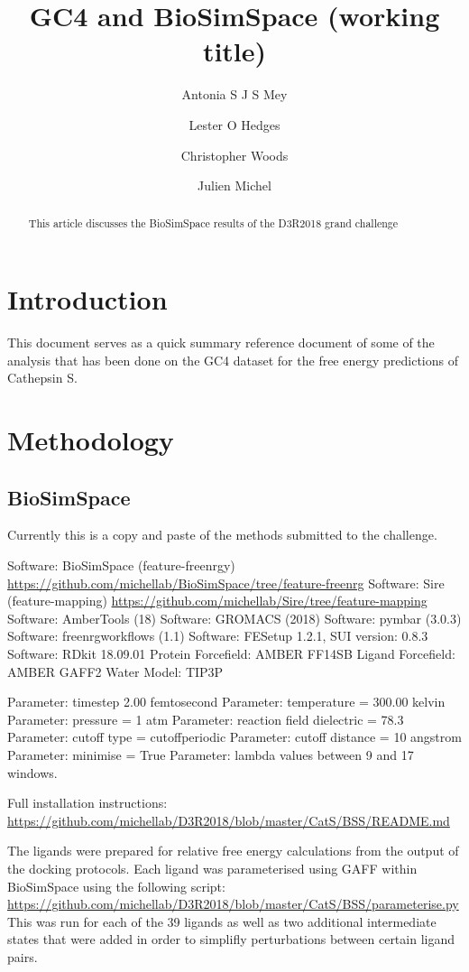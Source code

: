 \documentclass[9pt,comparison]{livecoms}
\title{GC4 and BioSimSpace (working title)}
\author[1*]{Antonia S J S Mey}
\author[2*\authfn{1}\authfn{3}]{Lester O Hedges}
\author[2\authfn{1}\authfn{4}]{Christopher Woods}
\author[1]{Julien Michel }
\affil[1]{Edinburgh}
\affil[2]{Bristol}
\begin{document}
\begin{frontmatter}
\maketitle

\begin{abstract}
This article discusses the BioSimSpace results of the D3R2018 grand challenge
\end{abstract}

\end{frontmatter}




\section{Introduction}

This document serves as a quick summary reference document of some of the analysis that has been done on the GC4 dataset for the free energy predictions of Cathepsin S. 

\section{Methodology}
\subsection{BioSimSpace}
Currently this is a copy and paste of the methods submitted to the challenge.

Software: BioSimSpace (feature-freenrgy) \url{https://github.com/michellab/BioSimSpace/tree/feature-freenrg}
Software: Sire (feature-mapping) \url{https://github.com/michellab/Sire/tree/feature-mapping}
Software: AmberTools (18)
Software: GROMACS (2018)
Software: pymbar (3.0.3)
Software: freenrgworkflows (1.1)
Software: FESetup 1.2.1, SUI version: 0.8.3
Software: RDkit 18.09.01
Protein Forcefield: AMBER FF14SB
Ligand Forcefield: AMBER GAFF2
Water Model: TIP3P

Parameter: timestep 2.00 femtosecond
Parameter: temperature = 300.00 kelvin
Parameter: pressure = 1 atm
Parameter: reaction field dielectric = 78.3
Parameter: cutoff type = cutoffperiodic
Parameter: cutoff distance = 10 angstrom
Parameter: minimise = True
Parameter: lambda values between 9 and 17 windows. 

Full installation instructions:
\url{https://github.com/michellab/D3R2018/blob/master/CatS/BSS/README.md}

The ligands were prepared for relative free energy calculations from the output
of the docking protocols. Each ligand was parameterised using GAFF within
BioSimSpace using the following script:
\url{https://github.com/michellab/D3R2018/blob/master/CatS/BSS/parameterise.py}
This was run for each of the 39 ligands as well as two additional intermediate
states that were added in order to simplifly perturbations between certain
ligand pairs.
\end{document}
